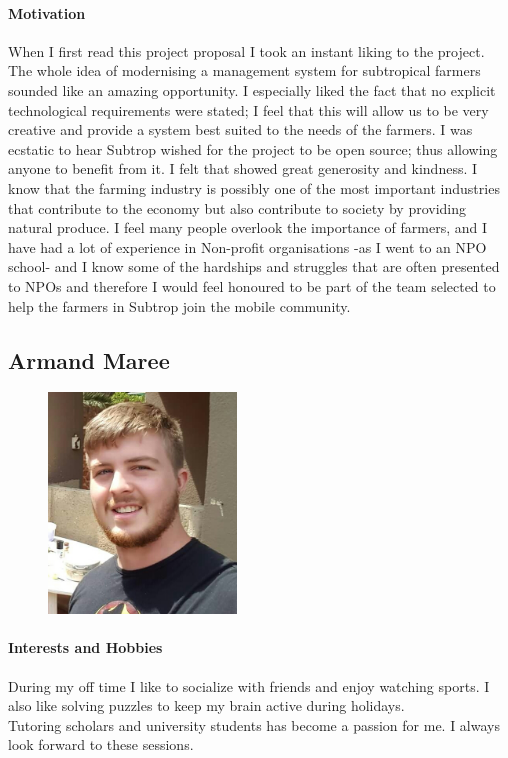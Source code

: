 \documentclass[english]{article}
\begin{document}
		\paragraph{Motivation}
		When I first read this project proposal I took an instant liking to the project. The whole idea of modernising a management system for subtropical farmers sounded like an amazing opportunity. I especially liked the fact that no explicit technological requirements were stated; I feel that this will allow us to be very creative and provide a system best suited to the needs of the farmers. I was ecstatic to hear Subtrop wished for the project to be open source; thus allowing anyone to benefit from it. I felt that showed great generosity and kindness. I know that the farming industry is possibly one of the most important industries that contribute to the economy but also contribute to society by providing natural produce. I feel many people overlook the importance of farmers, and I have had a lot of experience in Non-profit organisations -as I went to an NPO school- and I know some of the hardships and struggles that are often presented to NPOs and therefore I would feel honoured to be part of the team selected to help the farmers in Subtrop join the mobile community.
		
		\subsection{Armand Maree}
			\begin{figure}
				\begin{center}
					\includegraphics[width=5cm]{armand.jpg}
				\end{center}
			\end{figure}
			\paragraph{Interests and Hobbies}
			During my off time I like to socialize with friends and enjoy watching sports. I also like solving puzzles to keep my brain active during holidays.\\
			Tutoring scholars and university students has become a passion for me. I always look forward to these sessions.
			
\end{document}
